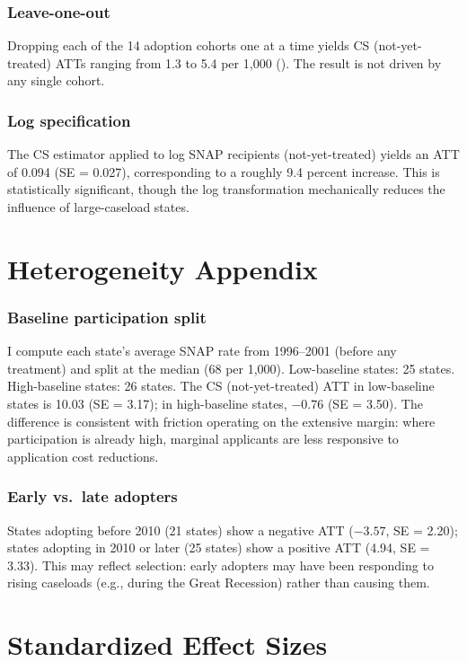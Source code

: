 \documentclass[12pt]{article}
\begin{document}
\subsubsection*{Leave-one-out} Dropping each of the 14 adoption cohorts one at a time yields CS (not-yet-treated) ATTs ranging from 1.3 to 5.4 per 1,000 (). The result is not driven by any single cohort.

\subsubsection*{Log specification} The CS estimator applied to log SNAP recipients (not-yet-treated) yields an ATT of 0.094 (SE = 0.027), corresponding to a roughly 9.4 percent increase. This is statistically significant, though the log transformation mechanically reduces the influence of large-caseload states.

\section{Heterogeneity Appendix}

\subsubsection*{Baseline participation split} I compute each state's average SNAP rate from 1996--2001 (before any treatment) and split at the median (68 per 1,000). Low-baseline states: 25 states. High-baseline states: 26 states. The CS (not-yet-treated) ATT in low-baseline states is 10.03 (SE = 3.17); in high-baseline states, $-0.76$ (SE = 3.50). The difference is consistent with friction operating on the extensive margin: where participation is already high, marginal applicants are less responsive to application cost reductions.

\subsubsection*{Early vs.\ late adopters} States adopting before 2010 (21 states) show a negative ATT ($-3.57$, SE = 2.20); states adopting in 2010 or later (25 states) show a positive ATT (4.94, SE = 3.33). This may reflect selection: early adopters may have been responding to rising caseloads (e.g., during the Great Recession) rather than causing them.

\section{Standardized Effect Sizes}
\label{sec:sde}


\end{document}
